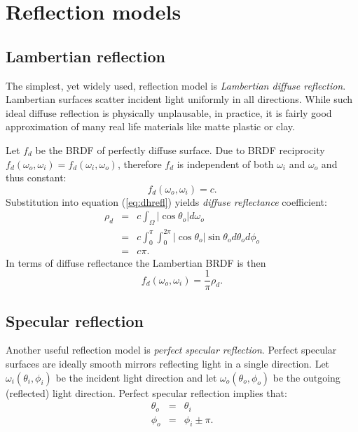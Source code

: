 \section{Reflection models}

\subsection{Lambertian reflection}
The simplest, yet widely used, reflection model is \emph{Lambertian diffuse reflection}. Lambertian surfaces scatter incident light uniformly in all directions. While such ideal diffuse reflection is physically unplausable, in practice, it is fairly good approximation of many real life materials like matte plastic or clay.

Let $f_{d}$ be the BRDF of perfectly diffuse surface. Due to BRDF reciprocity $f_{d}(\omega_{o}, \omega_{i}) = f_{d}(\omega_{i}, \omega_{o})$, therefore $f_{d}$ is independent of both $\omega_{i}$ and $\omega_{o}$ and thus constant:
\begin{equation}
  f_{d}(\omega_{o}, \omega_{i}) = c.
\end{equation}
Substitution into equation (\ref{eq:dhrefl}) yields \emph{diffuse reflectance} coefficient:
\begin{eqnarray}
  \rho_{d} &=& c \int_{\Omega} |\cos\theta_{o}| d\omega_{o} \\
  &=& c \int_{0}^{\pi} \int_{0}^{2\pi} |\cos\theta_{o}| \sin\theta_{o} d\theta_{o} d\phi_{o} \\
  &=& c \pi.
\end{eqnarray}
In terms of diffuse reflectance the Lambertian BRDF is then
\begin{equation}
  f_{d}(\omega_{o}, \omega_{i}) = \frac{1}{\pi} \rho_{d}.
\end{equation}

\subsection{Specular reflection}
Another useful reflection model is \emph{perfect specular reflection}. Perfect specular surfaces are ideally smooth mirrors reflecting light in a single direction. Let $\omega_{i}(\theta_{i}, \phi_{i})$ be the incident light direction and let $\omega_{o}(\theta_{o}, \phi_{o})$ be the outgoing (reflected) light direction. Perfect specular reflection implies that:
\begin{eqnarray}
\label{eq:reflection}
  \theta_{o} &=& \theta_{i} \nonumber \\
  \phi_{o} &=& \phi_{i} \pm \pi.
\end{eqnarray}

